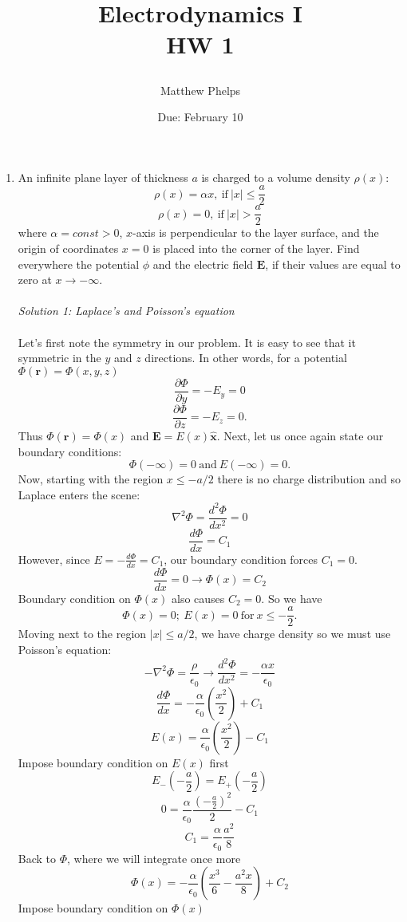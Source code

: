 \documentclass[11pt,letterpaper]{article}
\title{\begin{spacing}{1.2}Electrodynamics I\\HW 1\end{spacing}}
\author{Matthew Phelps}
\date{Due: February 10}
\newcommand{\vect}[1]{\mathbf{#1}}
\begin{document}
\maketitle

\begin{enumerate}
  \item An infinite plane layer of thickness $a$ is charged to a volume density $\rho(x)$:
  $$\rho(x) = \alpha x,\ \text{if}\ |x|\leq\frac{a}{2}$$
  $$\rho(x) = 0,\ \text{if}\ |x|>\frac{a}{2}$$
where $\alpha = const > 0$, $x$-axis is perpendicular to the layer surface, and the origin of coordinates $x=0$ is placed into the corner of the layer. Find everywhere the potential $\phi$ and the electric field $\vect E$, if their values are equal to zero at $x\rightarrow-\infty$.
\\ \\\emph{Solution 1: Laplace's and Poisson's equation}\\ \\
Let's first note the symmetry in our problem. It is easy to see that it symmetric in the $y$ and $z$ directions. In other words, for a potential $\Phi(\vect r) = \Phi(x,y,z)$
$$\frac{\partial\Phi}{\partial y}=-E_y = 0$$
$$\frac{\partial\Phi}{\partial z}= -E_z= 0.$$
Thus $\Phi(\vect r) = \Phi(x)$ and $\vect E = E(x)\hat{\vect x}$. Next, let us once again state our boundary conditions:
$$\Phi(-\infty) = 0\ \text{and}\ E(-\infty) = 0.$$
Now, starting with the region $x\leq -a/2$ there is no charge distribution and so Laplace enters the scene:
$$\nabla^2\Phi = \frac{d^2\Phi}{dx^2}=0$$
$$\frac{d\Phi}{dx} = C_1$$
However, since $E = -\frac{d\Phi}{dx} = C_1$, our boundary condition forces $C_1 = 0$.
$$\frac{d\Phi}{dx} = 0\rightarrow \Phi(x) = C_2$$
Boundary condition on $\Phi(x)$ also causes $C_2 = 0$. So we have 
$$\Phi(x) = 0;\ E(x) = 0\ \text{for}\ x\leq-\frac{a}{2}.$$
Moving next to the region $|x|\leq a/2$, we have charge density so we must use Poisson's equation:
$$-\nabla^2\Phi = \frac{\rho}{\epsilon_0}\rightarrow\frac{d^2\Phi}{dx^2} = -\frac{\alpha x}{\epsilon_0}$$
$$\frac{d\Phi}{dx} = -\frac{\alpha}{\epsilon_0}\left(\frac{x^2}{2}\right)+C_1$$
$$E(x) = \frac{\alpha}{\epsilon_0}\left(\frac{x^2}{2}\right)-C_1$$
Impose boundary condition on $E(x)$ first
$$E_-(-\frac{a}{2}) = E_+(-\frac{a}{2}) $$
$$ 0 = \frac{\alpha}{\epsilon_0}\frac{(-\frac{a}{2})^2}{2}-C_1$$
$$C_1 = \frac{\alpha}{\epsilon_0}\frac{a^2}{8}$$
Back to $\Phi$, where we will integrate once more
$$\Phi(x) = -\frac{\alpha}{\epsilon_0}\left(\frac{x^3}{6}-\frac{a^2x}{8}\right)+C_2$$
Impose boundary condition on $\Phi(x)$

\end{enumerate}
\end{document}
